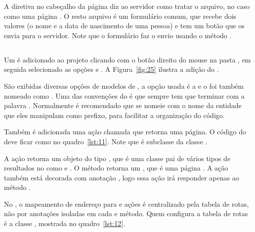 
A diretiva  no cabeçalho da página diz ao servidor como tratar o arquivo, no caso como uma página . O resto arquivo é um formulário  comum, que recebe dois valores (o nome e a data de nascimento de uma pessoa) e tem um botão que os envia para o servidor. Note que o formulário faz o envio usando o método .

\subsection{}

Um  é adicionado ao projeto  clicando com o botão direito do mouse na pasta , em seguida selecionado as opções  e . A Figura~\ref{fig:25} ilustra a adição do .


São exibidas diversas opções de modelos de , a opção usada é a  e o  foi também nomeado como . Uma das convenções do  é que  sempre tem que terminar com a palavra . Normalmente é recomendado que se nomeie  com o nome da entidade que eles manipulam como prefixo, para facilitar a organização do código.

Também é adicionada uma ação chamada  que retorna uma página. O código do  deve ficar como no quadro~\ref{lst:11}. Note que  é subclasse da classe .


A ação  retorna um objeto do tipo , que é uma classe pai de vários tipos de resultados no  como  e . O método  retorna um , que é uma página . A ação  também está decorada com anotação , logo essa ação irá responder apenas ao método .

No , o mapeamento de endereço para  e ações é centralizado pela tabela de rotas, não por anotações isoladas em cada  e método. Quem configura a tabela de rotas é a classe , mostrada no quadro~\ref{lst:12}.

